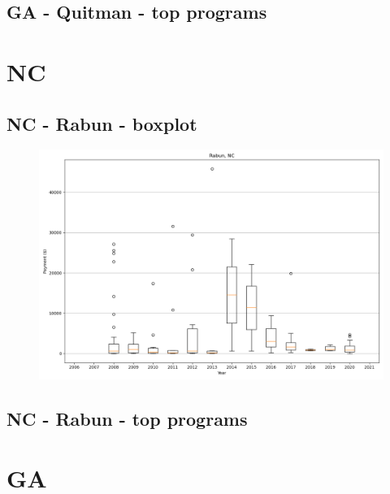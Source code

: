 \subsection*{GA - Quitman - top programs}

\newpage
\section*{NC}
\subsection*{NC - Rabun - boxplot}
\begin{figure}[h]
\centering
\includegraphics[width=7in]{../output/boxplots/counties/Rabun-NC_boxplot.png}
\end{figure}


\subsection*{NC - Rabun - top programs}

\newpage
\section*{GA}
